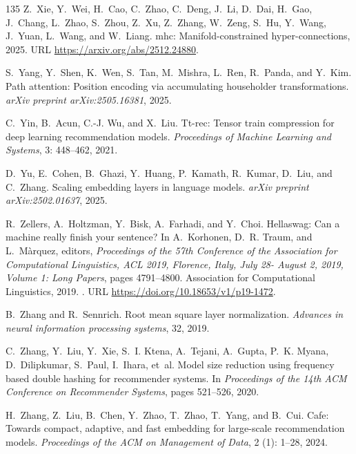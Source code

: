 \begin{thebibliography}{135}
Z.~Xie, Y.~Wei, H.~Cao, C.~Zhao, C.~Deng, J.~Li, D.~Dai, H.~Gao, J.~Chang,
  L.~Zhao, S.~Zhou, Z.~Xu, Z.~Zhang, W.~Zeng, S.~Hu, Y.~Wang, J.~Yuan, L.~Wang,
  and W.~Liang.
\newblock mhc: Manifold-constrained hyper-connections, 2025.
\newblock URL \url{https://arxiv.org/abs/2512.24880}.

S.~Yang, Y.~Shen, K.~Wen, S.~Tan, M.~Mishra, L.~Ren, R.~Panda, and Y.~Kim.
\newblock Path attention: Position encoding via accumulating householder
  transformations.
\newblock \emph{arXiv preprint arXiv:2505.16381}, 2025.

C.~Yin, B.~Acun, C.-J. Wu, and X.~Liu.
\newblock Tt-rec: Tensor train compression for deep learning recommendation
  models.
\newblock \emph{Proceedings of Machine Learning and Systems}, 3:
  448--462, 2021.

D.~Yu, E.~Cohen, B.~Ghazi, Y.~Huang, P.~Kamath, R.~Kumar, D.~Liu, and C.~Zhang.
\newblock Scaling embedding layers in language models.
\newblock \emph{arXiv preprint arXiv:2502.01637}, 2025.

R.~Zellers, A.~Holtzman, Y.~Bisk, A.~Farhadi, and Y.~Choi.
\newblock Hellaswag: Can a machine really finish your sentence?
\newblock In A.~Korhonen, D.~R. Traum, and L.~M{\`{a}}rquez, editors,
  \emph{Proceedings of the 57th Conference of the Association for Computational
  Linguistics, {ACL} 2019, Florence, Italy, July 28- August 2, 2019, Volume 1:
  Long Papers}, pages 4791--4800. Association for Computational Linguistics,
  2019.
\newblock {}.
\newblock URL \url{https://doi.org/10.18653/v1/p19-1472}.

B.~Zhang and R.~Sennrich.
\newblock Root mean square layer normalization.
\newblock \emph{Advances in neural information processing systems}, 32, 2019.

C.~Zhang, Y.~Liu, Y.~Xie, S.~I. Ktena, A.~Tejani, A.~Gupta, P.~K. Myana,
  D.~Dilipkumar, S.~Paul, I.~Ihara, et~al.
\newblock Model size reduction using frequency based double hashing for
  recommender systems.
\newblock In \emph{Proceedings of the 14th ACM Conference on Recommender
  Systems}, pages 521--526, 2020.

H.~Zhang, Z.~Liu, B.~Chen, Y.~Zhao, T.~Zhao, T.~Yang, and B.~Cui.
\newblock Cafe: Towards compact, adaptive, and fast embedding for large-scale
  recommendation models.
\newblock \emph{Proceedings of the ACM on Management of Data}, 2
  (1): 1--28, 2024.


\end{thebibliography}
